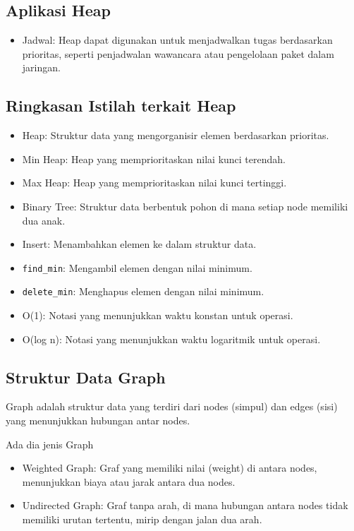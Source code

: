 \documentclass{article}
\begin{document}
\subsection{Aplikasi Heap}
\begin{itemize}
    \item Jadwal: Heap dapat digunakan untuk menjadwalkan tugas berdasarkan prioritas, seperti penjadwalan wawancara atau pengelolaan paket dalam jaringan.
\end{itemize}

\subsection{Ringkasan Istilah terkait Heap}
\begin{itemize}
    \item Heap: Struktur data yang mengorganisir elemen berdasarkan prioritas.
    \item Min Heap: Heap yang memprioritaskan nilai kunci terendah.
    \item Max Heap: Heap yang memprioritaskan nilai kunci tertinggi.
    \item Binary Tree: Struktur data berbentuk pohon di mana setiap node memiliki dua anak.
    \item Insert: Menambahkan elemen ke dalam struktur data.
    \item \verb|find_min|: Mengambil elemen dengan nilai minimum.
    \item \verb|delete_min|: Menghapus elemen dengan nilai minimum.
    \item O(1): Notasi yang menunjukkan waktu konstan untuk operasi.
    \item O(log n): Notasi yang menunjukkan waktu logaritmik untuk operasi.
\end{itemize}

\subsection{Struktur Data Graph}
Graph adalah struktur data yang terdiri dari nodes (simpul) dan edges (sisi) yang menunjukkan hubungan antar nodes.

Ada dia jenis Graph
\begin{itemize}
    \item Weighted Graph: Graf yang memiliki nilai (weight) di antara nodes, menunjukkan biaya atau jarak antara dua nodes.
    \item Undirected Graph: Graf tanpa arah, di mana hubungan antara nodes tidak memiliki urutan tertentu, mirip dengan jalan dua arah.
\end{itemize}
\end{document}
